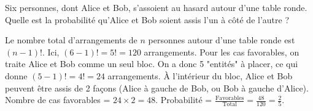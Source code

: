 \begin{exercicebox}
Six personnes, dont Alice et Bob, s'assoient au hasard autour d'une table ronde. Quelle est la probabilité qu'Alice et Bob soient assis l'un à côté de l'autre ?
\end{exercicebox}

\begin{correctionbox}
Le nombre total d'arrangements de $n$ personnes autour d'une table ronde est $(n-1)!$. Ici, $(6-1)! = 5! = 120$ arrangements.
Pour les cas favorables, on traite Alice et Bob comme un seul bloc. On a donc 5 "entités" à placer, ce qui donne $(5-1)! = 4! = 24$ arrangements.
À l'intérieur du bloc, Alice et Bob peuvent être assis de 2 façons (Alice à gauche de Bob, ou Bob à gauche d'Alice).
Nombre de cas favorables = $24 \times 2 = 48$.
Probabilité = $\frac{\text{Favorables}}{\text{Total}} = \frac{48}{120} = \frac{2}{5}$.
\end{correctionbox}